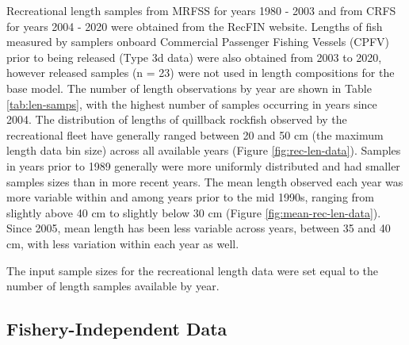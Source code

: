 \documentclass[11pt,
  english,
  a4paper,
]{article}
\begin{document}
\leavevmode\tagmcend\tagstructend


Recreational length samples from MRFSS for years 1980 - 2003 and from CRFS for years 2004 - 2020 were obtained from the RecFIN website. Lengths of fish measured by samplers onboard Commercial Passenger Fishing Vessels (CPFV) prior to being released (Type 3d data) were also obtained from 2003 to 2020, however released samples (n = 23) were not used in length compositions for the base model. The number of length observations by year are shown in Table \ref{tab:len-samps}, with the highest number of samples occurring in years since 2004. The distribution of lengths of quillback rockfish observed by the recreational fleet have generally ranged between 20 and 50 cm (the maximum length data bin size) across all available years (Figure \ref{fig:rec-len-data}). Samples in years prior to 1989 generally were more uniformly distributed and had smaller samples sizes than in more recent years. The mean length observed each year was more variable within and among years prior to the mid 1990s, ranging from slightly above 40 cm to slightly below 30 cm (Figure \ref{fig:mean-rec-len-data}). Since 2005, mean length has been less variable across years, between 35 and 40 cm, with less variation within each year as well.

\leavevmode\tagmcend\tagstructend\par


The input sample sizes for the recreational length data were set equal to the number of length samples available by year.

\leavevmode\tagmcend\tagstructend\par


\hypertarget{fishery-independent-data}{%
\subsection{Fishery-Independent Data}\label{fishery-independent-data}}

\leavevmode\tagmcend\tagstructend

\end{document}
